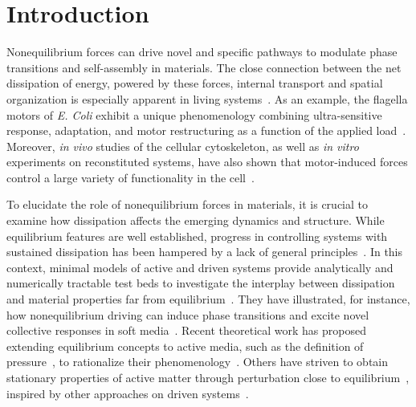 \documentclass[superscriptaddress, twocolumn, prx, longbibliography, nofootinbib]{revtex4-1}
\begin{document}


\section{Introduction}

Nonequilibrium forces can drive novel and specific pathways to modulate phase transitions and self-assembly in materials. The close connection between the net dissipation of energy, powered by these forces, internal transport and spatial organization is especially apparent in living systems~\cite{Toyabe2010, Ahmed2016, Battle604, Mura2018}. As an example, the flagella motors of {\it E. Coli} exhibit a unique phenomenology combining ultra-sensitive response, adaptation, and motor restructuring as a function of the applied load~\cite{Lele2013, Lan2012, Wang2017}. Moreover, {\it in vivo} studies of the cellular cytoskeleton, as well as {\it in vitro} experiments on reconstituted systems, have also shown that motor-induced forces control a large variety of functionality in the cell~\cite{Silva2011, Sanchez2012, Blanchoin2014, Murrell2015, Decamp2015}.


To elucidate the role of nonequilibrium forces in materials, it is crucial to examine how dissipation affects the emerging dynamics and structure. 
While equilibrium features are well established, progress in controlling systems with sustained dissipation has been hampered by a lack of general principles~\cite{Cates2015, Solon2015a, Nguyen2016, Fodor2016, Murugan2017, Nardini2017, Nguyen2018}. In this context, minimal models of active and driven systems provide analytically and numerically tractable test beds to investigate the interplay between dissipation and material properties far from equilibrium~\cite{Marchetti2013, Han2016, Bechinger2016, delJunco2018, Marchetti2018}. They have illustrated, for instance, how nonequilibrium driving can induce phase transitions and excite novel collective responses in soft media~\cite{Vicsek1995, Tailleur2008, Han2016, Nguyen2016, VanZuiden2016}. Recent theoretical work has proposed extending equilibrium concepts to active media, such as the definition of pressure~\cite{Takatori2015, Solon2015a}, to rationalize their phenomenology~\cite{Solon2018, Solon2018b}. Others have striven to obtain stationary properties of active matter through perturbation close to equilibrium~\cite{Farage2015, Nardini2017, Brader2017}, inspired by other approaches on driven systems~\cite{McLennan1959, Komatsu2008, Maes2009, Maes2010}.
\end{document}
